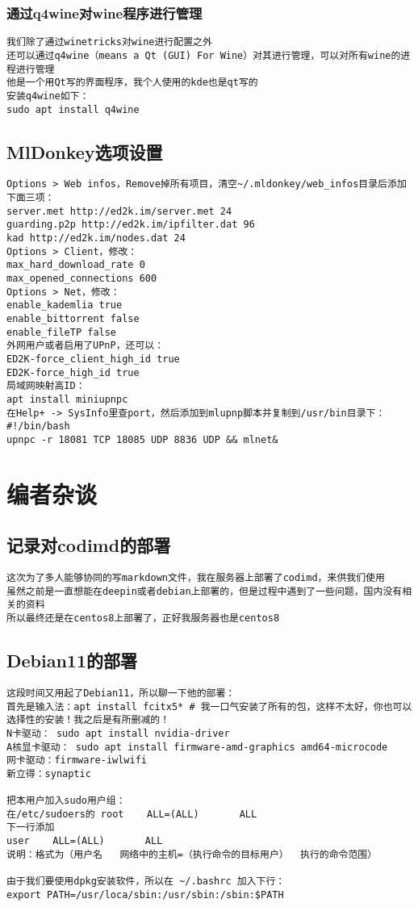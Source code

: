 \documentclass[a4paper,fontset=fandol,zihao=-4,linespread=1.2,oneside]{ctexbook}
\begin{document}
\subsection{通过q4wine对wine程序进行管理}
\begin{lstlisting}
我们除了通过winetricks对wine进行配置之外
还可以通过q4wine（means a Qt (GUI) For Wine）对其进行管理，可以对所有wine的进程进行管理
他是一个用Qt写的界面程序，我个人使用的kde也是qt写的
安装q4wine如下：
sudo apt install q4wine
\end{lstlisting}
	
\section{MlDonkey选项设置}
\begin{lstlisting}
Options > Web infos，Remove掉所有项目，清空~/.mldonkey/web_infos目录后添加下面三项：
server.met http://ed2k.im/server.met 24
guarding.p2p http://ed2k.im/ipfilter.dat 96
kad http://ed2k.im/nodes.dat 24
Options > Client，修改：
max_hard_download_rate 0
max_opened_connections 600
Options > Net，修改：
enable_kademlia true
enable_bittorrent false
enable_fileTP false
外网用户或者启用了UPnP，还可以：
ED2K-force_client_high_id true
ED2K-force_high_id true
局域网映射高ID：
apt install miniupnpc
在Help+ -> SysInfo里查port，然后添加到mlupnp脚本并复制到/usr/bin目录下：
#!/bin/bash
upnpc -r 18081 TCP 18085 UDP 8836 UDP && mlnet&
\end{lstlisting}
\chapter{编者杂谈}
\section{记录对codimd的部署}
\begin{lstlisting}
这次为了多人能够协同的写markdown文件，我在服务器上部署了codimd，来供我们使用
虽然之前是一直想能在deepin或者debian上部署的，但是过程中遇到了一些问题，国内没有相关的资料
所以最终还是在centos8上部署了，正好我服务器也是centos8
\end{lstlisting}
\section{Debian11的部署}
\begin{lstlisting}
这段时间又用起了Debian11，所以聊一下他的部署：
首先是输入法：apt install fcitx5* # 我一口气安装了所有的包，这样不太好，你也可以选择性的安装！我之后是有所删减的！
N卡驱动： sudo apt install nvidia-driver
A核显卡驱动： sudo apt install firmware-amd-graphics amd64-microcode
网卡驱动：firmware-iwlwifi
新立得：synaptic

把本用户加入sudo用户组：
在/etc/sudoers的 root    ALL=(ALL)       ALL
下一行添加
user    ALL=(ALL)       ALL
说明：格式为（用户名   网络中的主机=（执行命令的目标用户）  执行的命令范围）

由于我们要使用dpkg安装软件，所以在 ~/.bashrc 加入下行：
export PATH=/usr/loca/sbin:/usr/sbin:/sbin:$PATH
\end{lstlisting}
\end{document}
